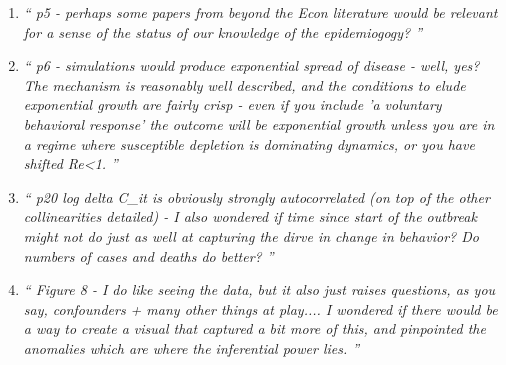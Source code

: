 \documentclass[11pt]{article}
\begin{document}
\begin{enumerate}
\item \textit{`` p5 - perhaps some papers from beyond the Econ literature would be relevant for a sense of the status of our knowledge of the epidemiogogy?  ''}

\item \textit{`` p6 - simulations would produce exponential spread of disease - well, yes? The mechanism is reasonably well described, and the conditions to elude exponential growth are fairly crisp - even if you include 'a voluntary behavioral response' the outcome will be exponential growth unless you are in a regime where susceptible depletion is dominating dynamics, or you have shifted Re<1.  ''}

\item \textit{`` p20 log delta C\_it is obviously strongly autocorrelated (on top of the other collinearities detailed) - I also wondered if time since start of the outbreak might not do just as well at capturing the dirve in change in behavior? Do numbers of cases and deaths do better? ''}

\item \textit{`` Figure 8 - I do like seeing the data, but it also just raises questions, as you say, confounders + many other things at play.... I wondered if there would be a way to create a visual that captured a bit more of this, and pinpointed the anomalies which are where the inferential power lies. ''}

\end{enumerate}
\end{document}
